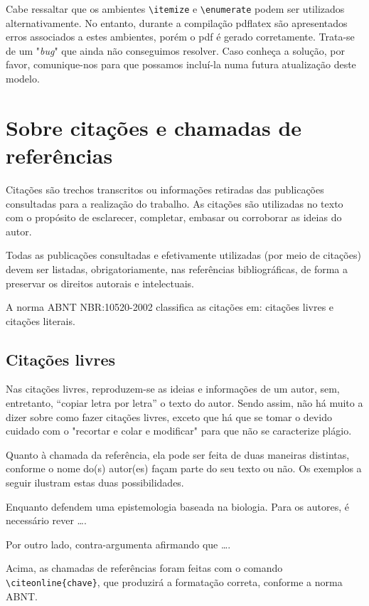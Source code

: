 \begin{apendicesenv}
Cabe ressaltar que os ambientes \verb|\itemize| e \verb|\enumerate| podem ser
utilizados alternativamente. No entanto, durante a compilação pdflatex são
apresentados erros associados a estes ambientes, porém o pdf é gerado
corretamente. Trata-se de um "\textit{bug}"{} que ainda não conseguimos
resolver. Caso conheça a solução, por favor, comunique-nos para que possamos
incluí-la numa futura atualização deste modelo.

\chapter{Sobre citações e chamadas de referências}
\label{chap:apSobreCita}

Citações são trechos transcritos ou informações retiradas das publicações
consultadas para a realização do trabalho. As citações são utilizadas no texto
com o propósito de esclarecer, completar, embasar ou corroborar as ideias do
autor.

Todas as publicações consultadas e efetivamente utilizadas (por meio de
citações) devem ser listadas, obrigatoriamente, nas referências bibliográficas,
de forma a preservar os direitos autorais e intelectuais.

A norma ABNT NBR:10520-2002 classifica as citações em: citações livres e
citações literais.

\section{Citações livres}
\label{sec:citacoesLivres}

Nas citações livres, reproduzem-se as ideias e informações de um autor, sem,
entretanto, ``copiar letra por letra'' o texto do autor. Sendo assim, não há
muito a dizer sobre como fazer citações livres, exceto que há que se tomar o
devido cuidado com o "recortar e colar e modificar"{} para que não se
caracterize plágio.

Quanto à chamada da referência, ela pode ser feita de duas maneiras distintas,
conforme o nome do(s) autor(es) façam parte do seu texto ou não. Os exemplos a
seguir ilustram estas duas possibilidades.

Enquanto  defendem uma epistemologia baseada na
biologia. Para os autores, é necessário rever \ldots.

Por outro lado,  contra-argumenta afirmando que \ldots.

Acima, as chamadas de referências foram feitas com o comando
\verb|\citeonline{chave}|, que produzirá a formatação correta, conforme a norma
ABNT.


\end{apendicesenv}

